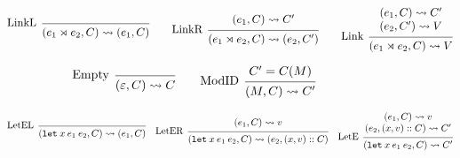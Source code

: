 \documentclass[acmsmall,review]{acmart}\settopmatter{printfolios=true,printccs=false,printacmref=false}
\theoremstyle{definition}
\theoremstyle{plain}
\newcommand*{\cons}{::}
\newcommand*{\semarrow}{\rightsquigarrow}
\newcommand*{\link}[2]{{#1}\rtimes{#2}}
\begin{document}
\begin{figure}[h!]
  \[
    \begin{prooftree}
      \infer[left label=LinkL]0{
      (\link{e_{1}}{e_{2}}, C)
      \semarrow
      (e_{1}, C)
      }
    \end{prooftree}\qquad
    \begin{prooftree}
      \hypo{
        \begin{matrix}
          (e_{1}, C)
          \semarrow
          C'
        \end{matrix}
      }
      \infer[left label=LinkR]1{
      (\link{e_{1}}{e_{2}}, C)
      \semarrow
      (e_{2}, C')
      }
    \end{prooftree}\qquad
    \begin{prooftree}
      \hypo{
        \begin{matrix}
          (e_{1}, C)
          \semarrow
          C' \\
          (e_{2}, C')
          \semarrow
          V
        \end{matrix}
      }
      \infer[left label=Link]1{
      (\link{e_{1}}{e_{2}}, C)
      \semarrow
      V
      }
    \end{prooftree}
  \]

  \[
    \begin{prooftree}
      \infer[left label=Empty]0{
      (\varepsilon, C)
      \semarrow
      C
      }
    \end{prooftree}\qquad
    \begin{prooftree}
      \hypo{C'=C(M)}
      \infer[left label=ModID]1{
      (M, C)
      \semarrow
      C'
      }
    \end{prooftree}
  \]

  \[
    \begin{prooftree}
      \infer[left label=LetEL]0{
      (\mathtt{let}\:x\:e_1\:e_2, C)
      \semarrow
      (e_{1}, C)
      }
    \end{prooftree}\quad
    \begin{prooftree}
      \hypo{
        \begin{matrix}
          (e_{1}, C)
          \semarrow
          v
        \end{matrix}
      }
      \infer[left label=LetER]1{
      (\mathtt{let}\:x\:e_1\:e_2, C)
      \semarrow
      (e_{2}, (x, v)\cons C)
      }
    \end{prooftree}\quad
    \begin{prooftree}
      \hypo{
        \begin{matrix}
          (e_{1}, C)
          \semarrow
          v \\
          (e_{2}, (x, v)\cons C)
          \semarrow
          C'
        \end{matrix}
      }
      \infer[left label=LetE]1{
      (\mathtt{let}\:x\:e_1\:e_2, C)
      \semarrow
      C'
      }
    \end{prooftree}
  \]


\end{figure}
\end{document}
